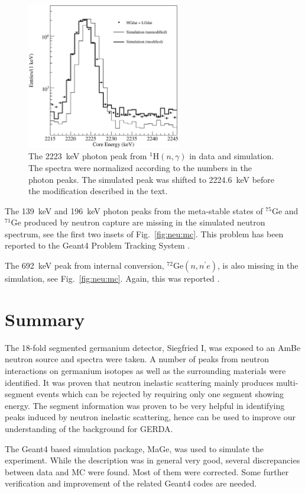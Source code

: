 \begin{figure}[tbhp]
\centering
\includegraphics[width=0.6\textwidth]{h2223}
\caption{The 2223~keV photon peak from $^{1}$H$(n,\gamma)$ in data and
simulation. The spectra were normalized according to the numbers in
the photon peaks. The simulated peak was shifted to 2224.6~keV before
the modification described in the text.}
\label{fig:neu:h2223}
\end{figure}

The 139~keV and 196~keV photon peaks from the meta-stable states of
$^{75}$Ge and $^{71}$Ge produced by neutron capture are missing in the
simulated neutron spectrum, see the first two insets of
Fig.~\ref{fig:neu:mc}. This problem has been reported to the Geant4
Problem Tracking System \cite{g4bug3}.

The 692~keV peak from internal conversion, $^{72}$Ge$(n,n^{\prime}e)$,
is also missing in the simulation, see Fig.~\ref{fig:neu:mc}. Again,
this was reported \cite{g4bug4}.

\section{Summary}
\label{sec:neu:out}
The 18-fold segmented germanium detector, Siegfried I, was exposed to
an AmBe neutron source and spectra were taken. A number of peaks from
neutron interactions on germanium isotopes as well as the surrounding
materials were identified. It was proven that neutron inelastic
scattering mainly produces multi-segment events which can be rejected
by requiring only one segment showing energy. The segment information
was proven to be very helpful in identifying peaks induced by neutron
inelastic scattering, hence can be used to improve our understanding
of the background for GERDA.

The Geant4 based simulation package, MaGe, was used to simulate the
experiment. While the description was in general very good, several
discrepancies between data and MC were found. Most of them were
corrected. Some further verification and improvement of the related
Geant4 codes are needed.


